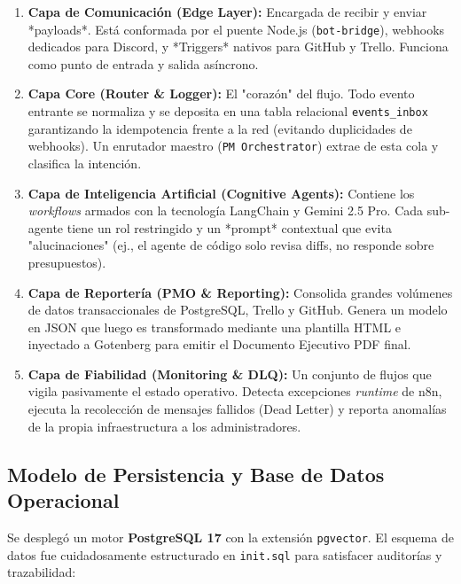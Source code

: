 \documentclass{encabezado}
\begin{document}
\begin{enumerate}
    \item \textbf{Capa de Comunicación (Edge Layer):} Encargada de recibir y enviar *payloads*. Está conformada por el puente Node.js (\texttt{bot-bridge}), webhooks dedicados para Discord, y *Triggers* nativos para GitHub y Trello. Funciona como punto de entrada y salida asíncrono.
    \item \textbf{Capa Core (Router \& Logger):} El "corazón" del flujo. Todo evento entrante se normaliza y se deposita en una tabla relacional \texttt{events\_inbox} garantizando la idempotencia frente a la red (evitando duplicidades de webhooks). Un enrutador maestro (\texttt{PM Orchestrator}) extrae de esta cola y clasifica la intención.
    \item \textbf{Capa de Inteligencia Artificial (Cognitive Agents):} Contiene los \textit{workflows} armados con la tecnología LangChain y Gemini 2.5 Pro. Cada sub-agente tiene un rol restringido y un *prompt* contextual que evita "alucinaciones" (ej., el agente de código solo revisa diffs, no responde sobre presupuestos).
    \item \textbf{Capa de Reportería (PMO \& Reporting):} Consolida grandes volúmenes de datos transaccionales de PostgreSQL, Trello y GitHub. Genera un modelo en JSON que luego es transformado mediante una plantilla HTML e inyectado a Gotenberg para emitir el Documento Ejecutivo PDF final.
    \item \textbf{Capa de Fiabilidad (Monitoring \& DLQ):} Un conjunto de flujos que vigila pasivamente el estado operativo. Detecta excepciones \textit{runtime} de n8n, ejecuta la recolección de mensajes fallidos (Dead Letter) y reporta anomalías de la propia infraestructura a los administradores.
\end{enumerate}

\subsection{Modelo de Persistencia y Base de Datos Operacional}

Se desplegó un motor \textbf{PostgreSQL 17} con la extensión \texttt{pgvector}. El esquema de datos fue cuidadosamente estructurado en \texttt{init.sql} para satisfacer auditorías y trazabilidad:
\end{document}
